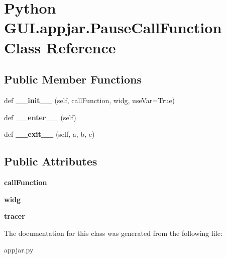 \hypertarget{class_python_01_g_u_i_1_1appjar_1_1_pause_call_function}{}\section{Python G\+U\+I.\+appjar.\+Pause\+Call\+Function Class Reference}
\label{class_python_01_g_u_i_1_1appjar_1_1_pause_call_function}
\subsection*{Public Member Functions}
\begin{DoxyCompactItemize}
\item 
\mbox{\label{class_python_01_g_u_i_1_1appjar_1_1_pause_call_function_ab6f983375d13fd886db7e9059ba61d46}} 
def {\bfseries \+\_\+\+\_\+init\+\_\+\+\_\+} (self, call\+Function, widg, use\+Var=True)
\item 
\mbox{\label{class_python_01_g_u_i_1_1appjar_1_1_pause_call_function_ab2822c6861842184ac05b057d71bc4b6}} 
def {\bfseries \+\_\+\+\_\+enter\+\_\+\+\_\+} (self)
\item 
\mbox{\label{class_python_01_g_u_i_1_1appjar_1_1_pause_call_function_a1258c82cd6ad00c34984ccc418387440}} 
def {\bfseries \+\_\+\+\_\+exit\+\_\+\+\_\+} (self, a, b, c)
\end{DoxyCompactItemize}
\subsection*{Public Attributes}
\begin{DoxyCompactItemize}
\item 
\mbox{\label{class_python_01_g_u_i_1_1appjar_1_1_pause_call_function_a3571681de36bf337f1e3110a6fd58b13}} 
{\bfseries call\+Function}
\item 
\mbox{\label{class_python_01_g_u_i_1_1appjar_1_1_pause_call_function_a977e8eea4183ea4286e355bb6f00dd39}} 
{\bfseries widg}
\item 
\mbox{\label{class_python_01_g_u_i_1_1appjar_1_1_pause_call_function_af435201d641279de0380af42de943f98}} 
{\bfseries tracer}
\end{DoxyCompactItemize}


The documentation for this class was generated from the following file\+:\begin{DoxyCompactItemize}
\item 
appjar.\+py\end{DoxyCompactItemize}
